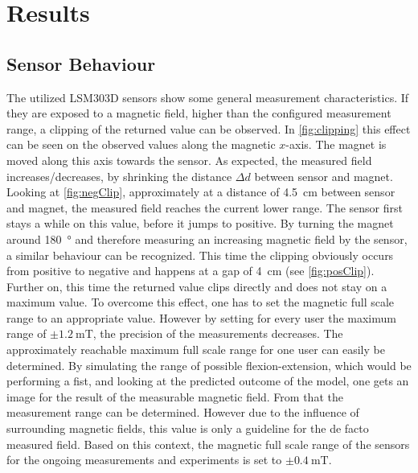 \lhead[\chaptername~\thechapter]{\rightmark}

\rhead[\leftmark]{}

\lfoot[\thepage]{}

\cfoot{}

\rfoot[]{\thepage}

\chapter{Results} \label{cha:results}

\section{Sensor Behaviour} \label{sec:dataRes}

The utilized LSM303D sensors show some general measurement characteristics. If they are exposed to a magnetic field, higher than the configured measurement range, a clipping of the returned value can be observed. In \ref{fig:clipping} this effect can be seen on the observed values along the magnetic $ x $-axis. The magnet is moved along this axis towards the sensor. As expected, the measured field increases/decreases, by shrinking the distance $ \Delta d $ between sensor and magnet. Looking at \ref{fig:negClip}, approximately at a distance of \SI{4.5}{\cm} between sensor and magnet, the measured field reaches the current lower range. The sensor first stays a while on this value, before it jumps to positive. By turning the magnet around \SI{180}{\degree} and therefore measuring an increasing magnetic field by the sensor, a similar behaviour can be recognized. This time the clipping obviously occurs from positive to negative and happens at a gap of \SI{4}{\cm} (see \ref{fig:posClip}). Further on, this time the returned value clips directly and does not stay on a maximum value. To overcome this effect, one has to set the magnetic full scale range to an appropriate value. However by setting for every user the maximum range of $ \pm \SI{1.2}{\milli \tesla} $, the precision of the measurements decreases. The approximately reachable maximum full scale range for one user can easily be determined. By simulating the range of possible flexion-extension, which would be performing a fist, and looking at the predicted outcome of the  model, one gets an image for the result of the measurable magnetic field. From that the measurement range can be determined. However due to the influence of surrounding magnetic fields, this value is only a guideline for the de facto measured field. Based on this context, the magnetic full scale range of the sensors for the ongoing measurements and experiments is set to $ \pm \SI{0.4}{\milli \tesla} $.

